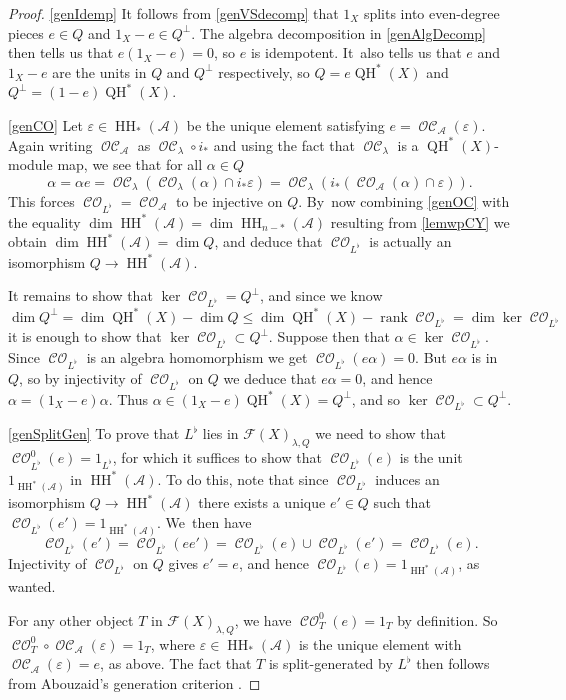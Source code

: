 \documentclass[JEP,XML,SOM,Unicode,NoEqCountersInSection,NoFloatCountersInSection,published]{cedram}
\theoremstyle{definition}
\let\eps\varepsilon
\newcommand{\LL}{L^\flat}
\newcommand{\calA}{\mathcal{A}}
\newcommand{\Fuk}{\mathcal{F}}
\newcommand{\HH}{\operatorname{HH}}
\newcommand{\CO}{\operatorname{\mathcal{CO}}}
\newcommand{\OC}{\operatorname{\mathcal{OC}}}
\newcommand{\QH}{\operatorname{QH}}
\begin{document}
\begin{proof}
\eqref{genIdemp} It follows from \eqref{genVSdecomp} that $1_X$ splits into even-degree pieces $e \!\in\! Q$ and \hbox{$1_X\!-\!e\!\in\! Q^\perp$}. The algebra decomposition in \eqref{genAlgDecomp} then tells us that $e (1_X - e) = 0$, so $e$ is idempotent. It~also tells us that $e$ and $1_X - e$ are the units in $Q$ and $Q^\perp$ respectively, so $Q = e \QH^*(X)$ and $Q^\perp = (1-e) \QH^*(X)$.

\eqref{genCO} Let $\eps \in \HH_*(\calA)$ be the unique element satisfying $e = \OC_\calA(\eps)$. Again writing $\OC_\calA$ as $\OC_\lambda \circ i_*$ and using the fact that $\OC_\lambda$ is a $\QH^*(X)$-module map, we see that for all $\alpha \in Q$
\[
\alpha = \alpha e = \OC_\lambda(\CO_\lambda(\alpha) \cap i_*\eps) = \OC_\lambda(i_*(\CO_\calA(\alpha) \cap \eps)).
\]
This forces $\CO_{\LL} = \CO_\calA$ to be injective on $Q$. By~now combining \eqref{genOC} with the equality $\dim \HH^*(\calA) = \dim \HH_{n-*}(\calA)$ resulting from \cref{lemwpCY} we obtain $\dim \HH^*(\calA) = \dim Q$, and deduce that $\CO_{\LL}$ is actually an isomorphism $Q \to \HH^*(\calA)$.

It remains to show that $\ker \CO_{\LL} = Q^\perp$, and since we know
\[
\dim Q^\perp = \dim \QH^*(X) - \dim Q \leq \dim \QH^*(X) - \operatorname{rank} \CO_{\LL} = \dim \ker \CO_{\LL}
\]
it is enough to show that $\ker \CO_{\LL} \subset Q^\perp$. Suppose then that $\alpha \in \ker \CO_{\LL}$. Since $\CO_{\LL}$ is an algebra homomorphism we get $\CO_{\LL}(e \alpha) = 0$. But $e \alpha$ is in $Q$, so by injectivity of $\CO_{\LL}$ on $Q$ we deduce that $e \alpha = 0$, and hence $\alpha = (1_X - e) \alpha$. Thus $\alpha \in (1_X - e) \QH^*(X) = Q^\perp$, and so $\ker \CO_{\LL} \subset Q^\perp$.

\eqref{genSplitGen} To prove that $\LL$ lies in $\Fuk(X)_{\lambda,Q}$ we need to show that $\CO^0_{\LL}(e) = 1_{\LL}$, for which it suffices to show that $\CO_{\LL}(e)$ is the unit $1_{\HH^*(\calA)}$ in $\HH^*(\calA)$. To do this, note that since $\CO_{\LL}$ induces an isomorphism $Q \to \HH^*(\calA)$ there exists a unique $e' \in Q$ such that $\CO_{\LL}(e') = 1_{\HH^*(\calA)}$. We~then have
\[
\CO_{\LL}(e') = \CO_{\LL}(e e') = \CO_{\LL}(e) \cup \CO_{\LL}(e') = \CO_{\LL}(e).
\]
Injectivity of $\CO_{\LL}$ on $Q$ gives $e' = e$, and hence $\CO_{\LL}(e) = 1_{\HH^*(\calA)}$, as wanted.

For any other object $T$ in $\Fuk(X)_{\lambda, Q}$, we have $\CO^0_T(e) = 1_T$ by definition. So~$\CO^0_T \circ \OC_\calA(\eps) = 1_T$, where $\eps \in \HH_*(\calA)$ is the unique element with $\OC_\calA(\eps) = e$, as above. The fact that $T$ is split-generated by $\LL$ then follows from Abouzaid's generation criterion \cite[Prop.\,1.3, Lem.\,1.4]{AbouzaidGeometricCriterion}.
\end{proof}
\end{document}
